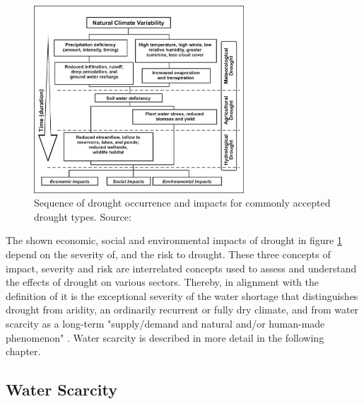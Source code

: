 \begin{figure}[!htp]
    \centering
    \includegraphics[width=0.7\textwidth]{figures/2023_MA_drought_stages.jpg}
    \decoRule
    \caption[Drought Sequences]{Sequence of drought occurrence and impacts for commonly accepted drought types. Source: \textcite{ndmcTypesDrought2023}}
    \label{fig:th_drought_sequences}
\end{figure}

The shown economic, social and environmental impacts of drought in figure \ref{fig:th_drought_sequences} depend on the severity of, and the risk to drought. These three concepts of impact, severity and risk are interrelated concepts used to assess and understand the effects of drought on various sectors. Thereby, in alignment with the definition of \textcite{vanloonDroughtHumanmodifiedWorld2016} it is the exceptional severity of the water shortage that distinguishes drought from aridity, an ordinarily recurrent or fully dry climate, and from water scarcity as a long-term "supply/demand and natural and/or human-made phenomenon" \autocites[7]{idmpDroughtWaterScarcity2022}. Water scarcity is described in more detail in the following chapter.

\subsection{Water Scarcity}\label{subsec:water_scarcity}

